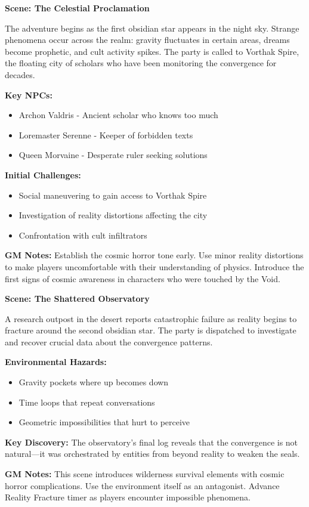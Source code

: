\documentclass[12pt,twoside]{article}
\newenvironment{scene}[1]{%
  \vspace{0.5cm}
  \begin{center}
    \textbf{\large Scene: #1}
  \end{center}
  \vspace{0.3cm}
}{}
\begin{document}
\begin{scene}{The Celestial Proclamation}
The adventure begins as the first obsidian star appears in the night sky. Strange phenomena occur across the realm: gravity fluctuates in certain areas, dreams become prophetic, and cult activity spikes. The party is called to Vorthak Spire, the floating city of scholars who have been monitoring the convergence for decades.

\textbf{Key NPCs:}
\begin{itemize}[leftmargin=*]
\item Archon Valdris - Ancient scholar who knows too much
\item Loremaster Serenne - Keeper of forbidden texts
\item Queen Morvaine - Desperate ruler seeking solutions
\end{itemize}

\textbf{Initial Challenges:}
\begin{itemize}[leftmargin=*]
\item Social maneuvering to gain access to Vorthak Spire
\item Investigation of reality distortions affecting the city
\item Confrontation with cult infiltrators
\end{itemize}

\textbf{GM Notes:} Establish the cosmic horror tone early. Use minor reality distortions to make players uncomfortable with their understanding of physics. Introduce the first signs of cosmic awareness in characters who were touched by the Void.
\end{scene}

\begin{scene}{The Shattered Observatory}
A research outpost in the desert reports catastrophic failure as reality begins to fracture around the second obsidian star. The party is dispatched to investigate and recover crucial data about the convergence patterns.

\textbf{Environmental Hazards:}
\begin{itemize}[leftmargin=*]
\item Gravity pockets where up becomes down
\item Time loops that repeat conversations
\item Geometric impossibilities that hurt to perceive
\end{itemize}

\textbf{Key Discovery:} The observatory's final log reveals that the convergence is not natural---it was orchestrated by entities from beyond reality to weaken the seals.

\textbf{GM Notes:} This scene introduces wilderness survival elements with cosmic horror complications. Use the environment itself as an antagonist. Advance Reality Fracture timer as players encounter impossible phenomena.
\end{scene}
\end{document}
